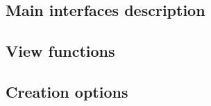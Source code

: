 \documentclass[12pt]{article}
\begin{document}
\subsection{Main interfaces description}
\subsection{View functions}
\subsection{Creation options}






























\end{document}
